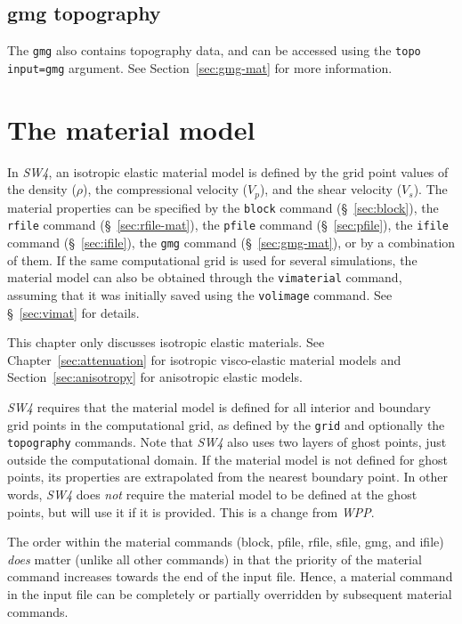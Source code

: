 \documentclass[11pt]{report}
\begin{document}
\section{gmg topography}\label{sec:topo-gmg}
The \verb+gmg+ also contains topography data, and can be accessed using 
the \verb+topo+ \verb+input=gmg+ argument.
See Section~\ref{sec:gmg-mat} for more information.


\chapter{The material model} \label{sec:material}

In \emph{SW4}, an isotropic elastic material model is defined by the grid point values of the density
($\rho$), the compressional velocity ($V_p$), and the shear velocity ($V_s$). The material
properties can be specified by the \verb+block+ command (\S~\ref{sec:block}), the \verb+rfile+ command (\S~\ref{sec:rfile-mat}), the \verb+pfile+
command (\S~\ref{sec:pfile}), the \verb+ifile+ command (\S~\ref{sec:ifile}), the \verb+gmg+ command (\S~\ref{sec:gmg-mat}), or by a combination of
them. If the same computational grid is used for several simulations, the material model can also be
obtained through the \verb+vimaterial+ command, assuming that it was initially saved using the
\verb+volimage+ command. See \S~\ref{sec:vimat} for details.

This chapter only discusses isotropic elastic materials. See Chapter~\ref{sec:attenuation} for
isotropic visco-elastic material models and Section~\ref{sec:anisotropy} for anisotropic elastic
models.

\emph{SW4} requires that the material model is defined for all interior and boundary grid points in
the computational grid, as defined by the {\tt grid} and optionally the {\tt topography}
commands. Note that \emph{SW4} also uses two layers of ghost points, just outside the computational
domain. If the material model is not defined for ghost points, its properties are extrapolated from
the nearest boundary point. In other words, \emph{SW4} does {\em not} require the material model to
be defined at the ghost points, but will use it if it is provided. This is a change from
\emph{WPP}.

The order within the material commands (block, pfile, rfile, sfile, gmg, and ifile) {\em does} matter (unlike
all other commands) in that the priority of the material command increases towards the end of the
input file. Hence, a material command in the input file can be completely or partially overridden by
subsequent material commands.
\end{document}
